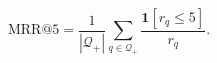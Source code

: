 \[
\mathrm{MRR@5}=\frac{1}{|\mathcal{Q}_{+}|}\sum_{q\in\mathcal{Q}_{+}}\frac{\mathbf{1}[r_q\leq 5]}{r_q}.
\]
